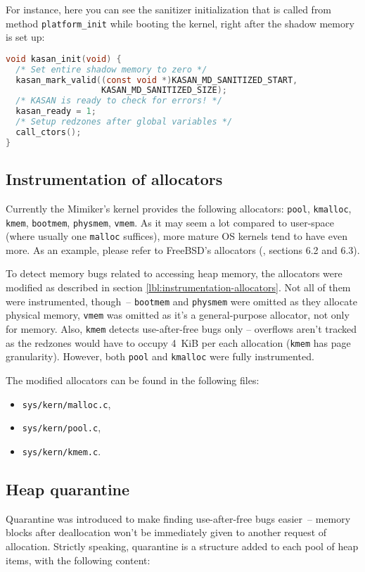 \documentclass[shortabstract, manyadvisors, english, mgr]{iithesis}
\theoremstyle{definition} \newtheorem*{definition}{Definicja}
\theoremstyle{definition} \newtheorem*{example}{Przykład}
\theoremstyle{definition} \newtheorem*{remark}{Uwaga}
\begin{document}
For instance, here you can see the sanitizer initialization that is called from method \texttt{platform\_init} while booting the kernel, right after the shadow memory is set up:
\begin{lstlisting}[language=C, caption={Function \texttt{kasan\_init} from file \texttt{sys/kern/kasan.c}.}]
void kasan_init(void) {
  /* Set entire shadow memory to zero */
  kasan_mark_valid((const void *)KASAN_MD_SANITIZED_START,
                   KASAN_MD_SANITIZED_SIZE);
  /* KASAN is ready to check for errors! */
  kasan_ready = 1;
  /* Setup redzones after global variables */
  call_ctors();
}
\end{lstlisting}

\subsection{Instrumentation of allocators}
Currently the Mimiker's kernel provides the following allocators: \texttt{pool}, \texttt{kmalloc}, \texttt{kmem}, \texttt{bootmem}, \texttt{physmem}, \texttt{vmem}. As it may seem a lot compared to user-space (where usually one \texttt{malloc} suffices), more mature OS kernels tend to have even more. As an example, please refer to FreeBSD's allocators (\cite{bib:freebsd-book}, sections 6.2 and 6.3).

To detect memory bugs related to accessing heap memory, the allocators were modified as described in section \ref{lbl:instrumentation-allocators}. Not all of them were instrumented, though~-- \texttt{bootmem} and \texttt{physmem} were omitted as they allocate physical memory, \texttt{vmem} was omitted as it's a general-purpose allocator, not only for memory. Also, \texttt{kmem} detects use-after-free bugs only -- overflows aren't tracked as the redzones would have to occupy 4~KiB per each allocation (\texttt{kmem} has page granularity). However, both \texttt{pool} and \texttt{kmalloc} were fully instrumented.

The modified allocators can be found in the following files:
\begin{itemize}
    \item \texttt{sys/kern/malloc.c},
    \item \texttt{sys/kern/pool.c},
    \item \texttt{sys/kern/kmem.c}.
\end{itemize}

\subsection{Heap quarantine}
\label{lbl:heap-quarantine}
Quarantine was introduced to make finding use-after-free bugs easier~-- memory blocks after deallocation won't be immediately given to another request of allocation. Strictly speaking, quarantine is a structure added to each pool of heap items, with the following content:
\end{document}
